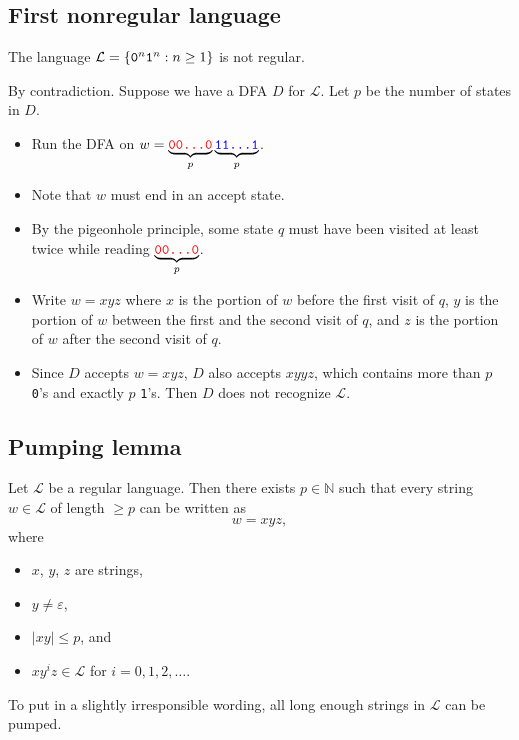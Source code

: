 \documentclass{notes}
\begin{document}
\subsection{First nonregular language}

\begin{thm}
  The language $\mathcal L = \left \{ \verb~0~^n \verb~1~^n : n \geq 1 \right \}$ is not regular.
\end{thm}

\begin{prf}
  By contradiction.
  Suppose we have a DFA $D$ for $\mathcal L$.
  Let $p$ be the number of states in $D$.
  
  \begin{itemize}
    \item Run the DFA on $w = \underbrace{\color{red} \verb~00...0~}_{p} \underbrace{\color{blue} \verb~11...1~}_{p}$.
      
    \item Note that $w$ must end in an accept state.

    \item By the pigeonhole principle, some state $q$ must have been visited at least twice while reading $\underbrace{\color{red} \verb~00...0~}_{p}$.
      
    \item Write $w = x y z$ where $x$ is the portion of $w$ before the first visit of $q$, $y$ is the portion of $w$ between the first and the second visit of $q$, and $z$ is the portion of $w$ after the second visit of $q$.
      
    \item Since $D$ accepts $w = x y z$, $D$ also accepts $x y y z$, which contains more than $p$ \verb~0~'s and exactly $p$ \verb~1~'s.
    Then $D$ does not recognize $\mathcal L$.
  \end{itemize}
\end{prf}

\newpage

\subsection{Pumping lemma}

\begin{lem}
  Let $\mathcal L$ be a regular language.
  Then there exists $p \in \mathbb N$ such that every string $w \in \mathcal L$ of length $\geq p$ can be written as 
  \[
    w = x y z, 
  \]
  where
  \begin{itemize}
    \item $x$, $y$, $z$ are strings, 

    \item $y \neq \varepsilon$, 

    \item $\left | x y \right | \leq p$, and 

    \item $x y^i z \in \mathcal L$ for $i = 0, 1, 2, \dots$.
  \end{itemize}
  
  To put in a slightly irresponsible wording, all long enough strings in $\mathcal L$ can be pumped.
\end{lem}
\end{document}
